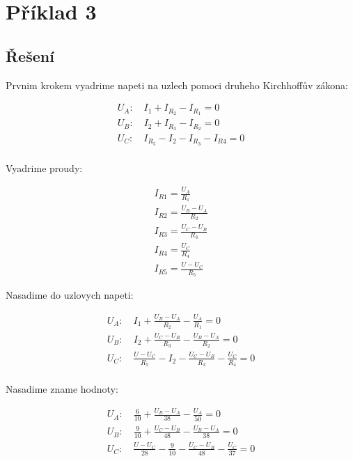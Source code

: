 \section{Příklad 3}

\makebox[\linewidth]{\rule{\textwidth}{0.5pt}}
\subsection{Řešení}

Prvnim krokem vyadrime napeti na uzlech pomoci druheho Kirchhoffův zákona:

\begin{gather*}
    U_{A}: \quad I_{1} + I_{R_2} - I_{R_1} = 0 \\
    U_{B}: \quad I_{2} + I_{R_3} - I_{R_2} = 0 \\
    U_{C}: \quad I_{R_5} - I_{2} - I_{R_3} - I_{R4} = 0 \\
\end{gather*}

Vyadrime proudy:

\begin{gather*}
    I_{R1} = \frac{U_{A}}{R_{1}} \\
    I_{R2} = \frac{U_{B} - U_{A}}{R_{2}} \\
    I_{R3} = \frac{U_{C} - U_{B}}{R_{3}} \\
    I_{R4} = \frac{U_{C}}{R_{4}} \\
    I_{R5} = \frac{U - U_{C}}{R_{5}}
\end{gather*}

Nasadime do uzlovych napeti:

\begin{gather*}
    U_{A}: \quad I_{1} + \frac{U_{B} - U_{A}}{R_{2}} - \frac{U_{A}}{R_{1}} = 0 \\
    U_{B}: \quad I_{2} + \frac{U_{C} - U_{B}}{R_{3}} - \frac{U_{B} - U_{A}}{R_{2}} = 0 \\
    U_{C}: \quad \frac{U - U_{C}}{R_{5}} - I_{2} - \frac{U_{C} - U_{B}}{R_{3}} - \frac{U_{C}}{R_{4}} = 0 \\
\end{gather*}

Nasadime zname hodnoty:

\begin{gather*}
    U_{A}: \quad \frac{6}{10} + \frac{U_{B} - U_{A}}{38} - \frac{U_{A}}{50} = 0 \\
    U_{B}: \quad \frac{9}{10} + \frac{U_{C} - U_{B}}{48} - \frac{U_{B} - U_{A}}{38} = 0 \\
    U_{C}: \quad \frac{U - U_{C}}{28} - \frac{9}{10} - \frac{U_{C} - U_{B}}{48} - \frac{U_{C}}{37} = 0
\end{gather*}

